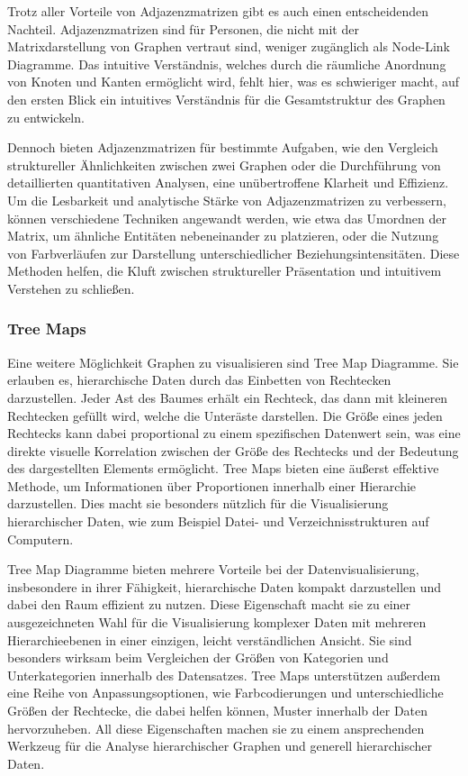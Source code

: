 Trotz aller Vorteile von Adjazenzmatrizen gibt es auch einen entscheidenden Nachteil. Adjazenzmatrizen sind für Personen, die nicht mit der Matrixdarstellung von Graphen vertraut sind, weniger zugänglich als Node-Link Diagramme. Das intuitive Verständnis, welches durch die räumliche Anordnung von Knoten und Kanten ermöglicht wird, fehlt hier, was es schwieriger macht, auf den ersten Blick ein intuitives Verständnis für die Gesamtstruktur des Graphen zu entwickeln.

Dennoch bieten Adjazenzmatrizen für bestimmte Aufgaben, wie den Vergleich struktureller Ähnlichkeiten zwischen zwei Graphen oder die Durchführung von detaillierten quantitativen Analysen, eine unübertroffene Klarheit und Effizienz. Um die Lesbarkeit und analytische Stärke von Adjazenzmatrizen zu verbessern, können verschiedene Techniken angewandt werden, wie etwa das Umordnen der Matrix, um ähnliche Entitäten nebeneinander zu platzieren, oder die Nutzung von Farbverläufen zur Darstellung unterschiedlicher Beziehungsintensitäten. Diese Methoden helfen, die Kluft zwischen struktureller Präsentation und intuitivem Verstehen zu schließen.

\subsubsection{Tree Maps}

Eine weitere Möglichkeit Graphen zu visualisieren sind Tree Map Diagramme. Sie erlauben es, hierarchische Daten durch das Einbetten von Rechtecken darzustellen. Jeder Ast des Baumes erhält ein Rechteck, das dann mit kleineren Rechtecken gefüllt wird, welche die Unteräste darstellen. Die Größe eines jeden Rechtecks kann dabei proportional zu einem spezifischen Datenwert sein, was eine direkte visuelle Korrelation zwischen der Größe des Rechtecks und der Bedeutung des dargestellten Elements ermöglicht. Tree Maps bieten eine äußerst effektive Methode, um Informationen über Proportionen innerhalb einer Hierarchie darzustellen. Dies macht sie besonders nützlich für die Visualisierung hierarchischer Daten, wie zum Beispiel Datei- und Verzeichnisstrukturen auf Computern.

Tree Map Diagramme bieten mehrere Vorteile bei der Datenvisualisierung, insbesondere in ihrer Fähigkeit, hierarchische Daten kompakt darzustellen und dabei den Raum effizient zu nutzen. Diese Eigenschaft macht sie zu einer ausgezeichneten Wahl für die Visualisierung komplexer Daten mit mehreren Hierarchieebenen in einer einzigen, leicht verständlichen Ansicht. Sie sind besonders wirksam beim Vergleichen der Größen von Kategorien und Unterkategorien innerhalb des Datensatzes. Tree Maps unterstützen außerdem eine Reihe von Anpassungsoptionen, wie Farbcodierungen und unterschiedliche Größen der Rechtecke, die dabei helfen können, Muster innerhalb der Daten hervorzuheben. All diese Eigenschaften machen sie zu einem ansprechenden Werkzeug für die Analyse hierarchischer Graphen und generell hierarchischer Daten.

